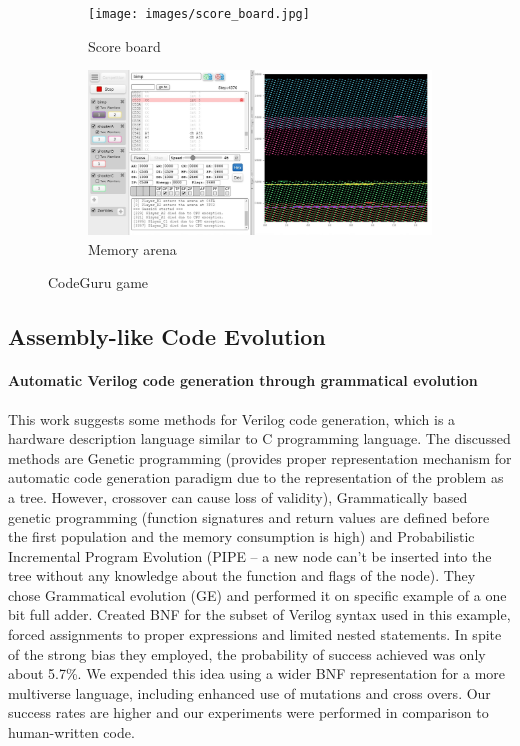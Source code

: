 \documentclass[dvipsnames,format=sigconf,anonymous=true,review=true]{acmart}
\begin{document}
\begin{figure}
  \centering
  \begin{subfigure}{0.48\textwidth}
    \texttt{[image: images/score\_board.jpg]}
    \caption{Score board}
    \label{fig:image1}
  \end{subfigure}
  \hfill
  \begin{subfigure}{0.48\textwidth}
    \includegraphics[width=\linewidth]{images/memory_use.jpg}
    \caption{Memory arena}
    \label{fig:image2}
  \end{subfigure}
  \caption{CodeGuru game}
  \label{fig:CodeGuru}
\end{figure}

\subsection{Assembly-like Code Evolution}
\paragraph{Automatic Verilog code generation through grammatical evolution}
This work \cite{ulya2005automatic} suggests some methods for Verilog code generation, which is a hardware description language similar to C programming language. The discussed methods are Genetic programming (provides proper representation mechanism for automatic code generation paradigm due to the representation of the problem as a tree. However, crossover can cause loss of validity), Grammatically based genetic programming (function signatures and return values are defined before the first population and the memory consumption is high) and Probabilistic Incremental Program Evolution (PIPE -- a new node can’t be inserted into the tree without any knowledge about the function and flags of the node). They chose Grammatical evolution (GE) and performed it on specific example of a one bit full adder. Created BNF for the subset of Verilog syntax used in this example, forced assignments to proper expressions and limited nested statements. In spite of the strong bias they employed, the probability of success achieved was only about 5.7\%. 
We expended this idea using a wider BNF representation for a more multiverse language, including enhanced use of mutations and cross overs. Our success rates are higher and our experiments were performed in comparison to human-written code.
\end{document}
